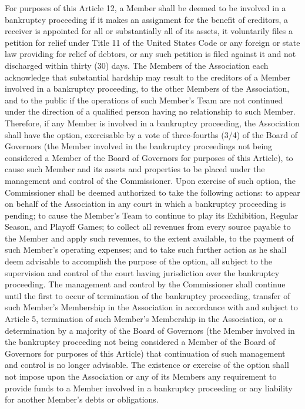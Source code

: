 \documentclass[]{book}
\theoremstyle{definition}
\theoremstyle{definition}
\theoremstyle{definition}
\theoremstyle{remark}
\begin{document}
For purposes of this Article 12, a Member shall be deemed to be involved
in a bankruptcy proceeding if it makes an assignment for the benefit of
creditors, a receiver is appointed for all or substantially all of its
assets, it voluntarily files a petition for relief under Title 11 of the
United States Code or any foreign or state law providing for relief of
debtors, or any such petition is filed against it and not discharged
within thirty (30) days. The Members of the Association each acknowledge
that substantial hardship may result to the creditors of a Member
involved in a bankruptcy proceeding, to the other Members of the
Association, and to the public if the operations of such Member's Team
are not continued under the direction of a qualified person having no
relationship to such Member. Therefore, if any Member is involved in a
bankruptcy proceeding, the Association shall have the option,
exercisable by a vote of three-fourths (3/4) of the Board of Governors
(the Member involved in the bankruptcy proceedings not being considered
a Member of the Board of Governors for purposes of this Article), to
cause such Member and its assets and properties to be placed under the
management and control of the Commissioner. Upon exercise of such
option, the Commissioner shall be deemed authorized to take the
following actions: to appear on behalf of the Association in any court
in which a bankruptcy proceeding is pending; to cause the Member's Team
to continue to play its Exhibition, Regular Season, and Playoff Games;
to collect all revenues from every source payable to the Member and
apply such revenues, to the extent available, to the payment of such
Member's operating expenses; and to take such further action as he shall
deem advisable to accomplish the purpose of the option, all subject to
the supervision and control of the court having jurisdiction over the
bankruptcy proceeding. The management and control by the Commissioner
shall continue until the first to occur of termination of the bankruptcy
proceeding, transfer of such Member's Membership in the Association in
accordance with and subject to Article 5, termination of such Member's
Membership in the Association, or a determination by a majority of the
Board of Governors (the Member involved in the bankruptcy proceeding not
being considered a Member of the Board of Governors for purposes of this
Article) that continuation of such management and control is no longer
advisable. The existence or exercise of the option shall not impose upon
the Association or any of its Members any requirement to provide funds
to a Member involved in a bankruptcy proceeding or any liability for
another Member's debts or obligations.
\end{document}
